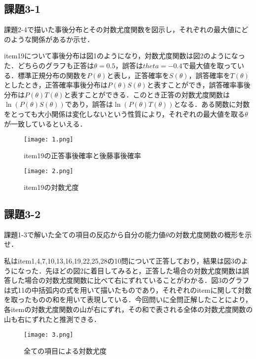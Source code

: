 \documentclass[12pt]{jarticle}
\begin{document}
\subsection{課題3-1}
\begin{shadebox}
    \quad 課題2-4で描いた事後分布とその対数尤度関数を図示し，それぞれの最大値にどのような関係があるか示せ．
\end{shadebox}
\vspace{\baselineskip}
item19について事後分布は図1のようになり，対数尤度関数は図2のようになった．どちらのグラフも正答は$\theta=0.5$，誤答は$theta=-0.4$で最大値を取っている．標準正規分布の関数を$P(\theta)$と表し，正答確率を$S(\theta)$，誤答確率を$T(\theta)$としたとき，正答確率事後分布は$P(\theta)S(\theta)$と表すことができ，誤答確率事後分布は$P(\theta)T(\theta)$と表すことができる．このとき正答の対数尤度関数は$\ln(P(\theta)S(\theta))$であり，誤答は$\ln(P(\theta)T(\theta))$となる．ある関数に対数をとっても大小関係は変化しないという性質により，それぞれの最大値を取る$\theta$が一致しているといえる．
\begin{figure}[H]
    \begin{center}
        \texttt{[image: 1.png]}
    \end{center}
    \caption{item19の正答事後確率と後藤事後確率}
    \label{fig1}
\end{figure}
\begin{figure}[H]
    \begin{center}
        \texttt{[image: 2.png]}
    \end{center}
    \caption{item19の対数尤度}
    \label{fig1}
\end{figure}
\subsection{課題3-2}
\begin{shadebox}
    \quad 課題1-3で解いた全ての項目の反応から自分の能力値$\theta$の対数尤度関数の概形を示せ．
\end{shadebox}
\vspace{\baselineskip}
私はitem1,4,7,10,13,16,19,22,25,28の10問について正答しており，結果は図3のようになった．先ほどの図2に着目してみると，正答した場合の対数尤度関数は誤答した場合の対数尤度関数に比べて右にずれていることがわかる．図3のグラフは式11の中括弧内の式を用いて描いたものであり，それぞれのitemに関して対数を取ったものの和を用いて表現している．今回問いに全問正解したことにより，各itemの対数尤度関数の山が右にずれ，その和で表される全体の対数尤度関数の山も右にずれたと推測できる．
\begin{figure}[H]
    \begin{center}
        \texttt{[image: 3.png]}
    \end{center}
    \caption{全ての項目による対数尤度}
    \label{fig1}
\end{figure}
\end{document}

